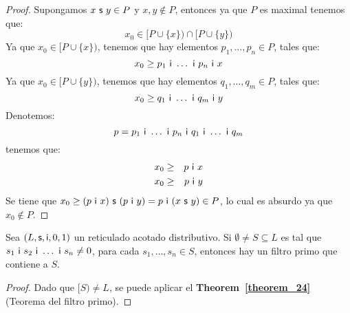 \begin{proof}
    \vspace{2mm}
    \PN Supongamos $x \ \mathsf{s} \ y \in P$ y $x, y \notin P$, entonces ya que $P$ es maximal tenemos que:
    \[
      x_{0} \in \lbrack P \cup \{x\}) \cap \lbrack P \cup \{y\})
    \]
    \PN Ya que $x_{0} \in \lbrack P \cup \{x\})$, tenemos que hay elementos $p_{1}, \dotsc, p_{n} \in P$, tales que:
    \[
      x_{0} \geq p_{1} \ \mathsf{i} \ \dotsc \ \mathsf{i} \ p_{n} \ \mathsf{i} \ x
    \]
    \PN Ya que $x_{0} \in \lbrack P \cup \{y\})$, tenemos que hay elementos $q_{1}, \dotsc, q_{m} \in P$, tales que:
    \[
      x_{0} \geq q_{1} \ \mathsf{i} \ \dotsc \ \mathsf{i} \ q_{m} \ \mathsf{i} \ y
    \]
    \PN Denotemos:
    \[
      p = p_{1} \ \IN \ \dotsc \ \IN \ p_{n} \ \IN \ q_{1} \ \IN \  \dotsc \ \IN \ q_{m}
    \]
    \PN tenemos que:
    \begin{eqnarray*}
      x_{0} &\geq& p \ \mathsf{i} \ x \\
      x_{0} &\geq& p \ \mathsf{i} \ y
    \end{eqnarray*}
    \PN Se tiene que $x_{0} \geq (p \ \mathsf{i} \ x) \ \mathsf{s} \ (p \ \mathsf{i} \ y) = p \ \mathsf{i} \ (x \ \mathsf{s} \ y) \in P$, lo cual es
    absurdo ya que $x_{0} \notin P$.
  \end{proof}

  \begin{corollary} \label{corollary_25}
    \PN Sea $(L, \mathsf{s}, \mathsf{i}, 0, 1)$ un reticulado acotado distributivo. Si $\emptyset \neq S \subseteq L$ es tal que $s_{1} \ \mathsf{i} \
    s_{2} \ \mathsf{i} \ \dotsc \ \mathsf{i} \ s_{n} \neq 0$, para cada $s_{1}, \dotsc, s_{n} \in S$, entonces hay un filtro primo que
    contiene a $S$.
  \end{corollary}
  \begin{proof}
    \PN Dado que $[S) \neq L$, se puede aplicar el \textbf{Theorem~\ref{theorem_24}} (Teorema del filtro primo).
  \end{proof}

